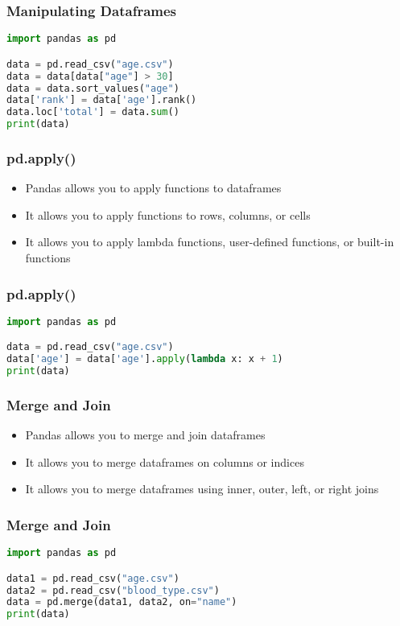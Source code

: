 \documentclass[serif, 9pt, aspectratio=32]{beamer}
\begin{document}
\begin{frame}[fragile]
    \frametitle{Manipulating Dataframes}
    \begin{lstlisting}[language=Python]
import pandas as pd

data = pd.read_csv("age.csv")
data = data[data["age"] > 30]
data = data.sort_values("age")
data['rank'] = data['age'].rank()
data.loc['total'] = data.sum()
print(data)
    \end{lstlisting}
\end{frame}

\begin{frame}
    \centering
    \frametitle{pd.apply()}
    \begin{itemize}
        \setlength{\itemsep}{2em}
        \item Pandas allows you to apply functions to dataframes
        \item It allows you to apply functions to rows, columns, or cells
        \item It allows you to apply lambda functions, user-defined functions, or built-in functions
    \end{itemize}
\end{frame}

\begin{frame}[fragile]
    \frametitle{pd.apply()}
    \begin{lstlisting}[language=Python]
import pandas as pd

data = pd.read_csv("age.csv")
data['age'] = data['age'].apply(lambda x: x + 1)
print(data)
    \end{lstlisting}
\end{frame}

\begin{frame}
    \centering
    \frametitle{Merge and Join}
    \begin{itemize}
        \setlength{\itemsep}{2em}
        \item Pandas allows you to merge and join dataframes
        \item It allows you to merge dataframes on columns or indices
        \item It allows you to merge dataframes using inner, outer, left, or right joins
    \end{itemize}
\end{frame}

\begin{frame}[fragile]
    \frametitle{Merge and Join}
    \begin{lstlisting}[language=Python]
import pandas as pd

data1 = pd.read_csv("age.csv")
data2 = pd.read_csv("blood_type.csv")
data = pd.merge(data1, data2, on="name")
print(data)
    \end{lstlisting}
\end{frame}
\end{document}
